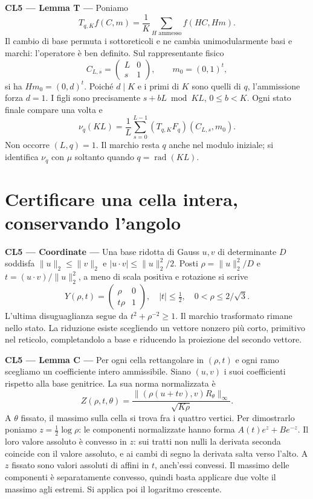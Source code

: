 \documentclass[11pt,a4paper]{article}
\newcommand{\CL}[1]{\textbf{#1 --- }}
\newcommand{\rad}{\operatorname{rad}}
\newcommand{\norm}[1]{\lVert#1\rVert}
\begin{document}
\CL{CL5 --- Lemma T} Poniamo
\[
T_{q,K}f(C,m)=\frac1K\sum_{H\text{ ammesso}}f(HC,Hm).
\]
Il cambio di base permuta i sottoreticoli e ne cambia unimodularmente basi e marchi: l'operatore è ben definito. Sul rappresentante fisico
\[
C_{L,s}=\begin{pmatrix}L&0\\s&1\end{pmatrix},\qquad m_0=(0,1)^t,
\]
si ha $Hm_0=(0,d)^t$. Poiché $d\mid K$ e i primi di $K$ sono quelli di $q$, l'ammissione forza $d=1$. I figli sono precisamente $s+bL\bmod KL$, $0\le b<K$. Ogni stato finale compare una volta e
\begin{equation}
\nu_q(KL)=\frac1L\sum_{s=0}^{L-1}(T_{q,K}F_q)(C_{L,s},m_0).
\tag{T}
\end{equation}
Non occorre $(L,q)=1$. Il marchio resta $q$ anche nel modulo iniziale; si identifica $\nu_q$ con $\mu$ soltanto quando $q=\rad(KL)$.

\section{Certificare una cella intera, conservando l'angolo}
\CL{CL5 --- Coordinate} Una base ridotta di Gauss $u,v$ di determinante $D$ soddisfa $\norm u_2\le\norm v_2$ e $|u\cdot v|\le\norm u_2^2/2$. Posti $\rho=\norm u_2^2/D$ e $t=(u\cdot v)/\norm u_2^2$, a meno di scala positiva e rotazione si scrive
\[
Y(\rho,t)=\begin{pmatrix}\rho&0\\t\rho&1\end{pmatrix},\quad
|t|\le\tfrac12,\quad0<\rho\le2/\sqrt3.
\]
L'ultima disuguaglianza segue da $t^2+\rho^{-2}\ge1$. Il marchio trasformato rimane nello stato. La riduzione esiste scegliendo un vettore nonzero più corto, primitivo nel reticolo, completandolo a base e riducendo la proiezione del secondo vettore.

\CL{CL5 --- Lemma C} Per ogni cella rettangolare in $(\rho,t)$ e ogni ramo scegliamo un coefficiente intero ammissibile. Siano $(u,v)$ i suoi coefficienti rispetto alla base genitrice. La sua norma normalizzata è
\[
Z(\rho,t,\theta)=\frac{\norm{(\rho(u+tv),v)R_\theta}_\infty}{\sqrt{K\rho}}.
\]
A $\theta$ fissato, il massimo sulla cella si trova fra i quattro vertici. Per dimostrarlo poniamo $z=\frac12\log\rho$: le componenti normalizzate hanno forma $A(t)e^z+Be^{-z}$. Il loro valore assoluto è convesso in $z$: sui tratti non nulli la derivata seconda coincide con il valore assoluto, e ai cambi di segno la derivata salta verso l'alto. A $z$ fissato sono valori assoluti di affini in $t$, anch'essi convessi. Il massimo delle componenti è separatamente convesso, quindi basta applicare due volte il massimo agli estremi. Si applica poi il logaritmo crescente.
\end{document}
